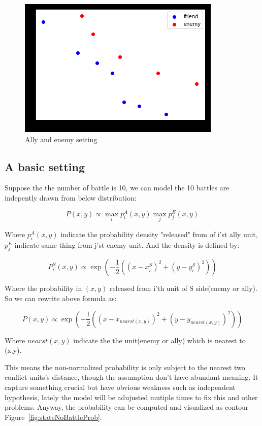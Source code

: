 \documentclass{article}
\begin{document}
\begin{figure}[h]
\includegraphics{state_no_battle.png}
\caption{Ally and enemy setting}
\label{fig:stateNoBattle}
\end{figure}

\subsection{A basic setting}

Suppose the the number of battle is 10, we can model the 10 battles are indepently drawn from below 
distribution:

$$
P(x,y) \propto \max_i p^A_{i}(x,y) \max_j p^E_{j} (x,y)
$$

Where $p^A_{i}(x,y)$ indicate the probability density "released" from of i’st ally unit,
$p^E_{j}$ indicate same thing from j’st enemy unit. And the density is defined by:

$$
P^S_i(x,y) \propto \exp(-\frac{1}{2}((x-x^S_i)^2 + (y-y^S_i)^2))
$$

Where the probability in $(x,y)$ released from i'th unit of S side(enemy or ally). 
So we can rewrite above formula as: 

$$
P(x,y) \propto \exp(-\frac{1}{2}((x-x_{nearst(x,y)})^2 + (y-y_{nearst(x,y)})^2))
$$

Where $nearst(x,y)$ indicate the the unit(enemy or ally) which is nearest to (x,y).

This means the non-normalized probability is only subject to the nearest two conflict units’s distance, 
though the assumption don’t have abundant meaning. 
It capture something crucial but have obvious weakness such as independent hypothesis, lately the 
model will be adujusted mutiple times to fix this and other problems. Anyway, the probability
 can be computed and visualized as contour Figure~\ref{fig:stateNoBattleProb}.
\end{document}
